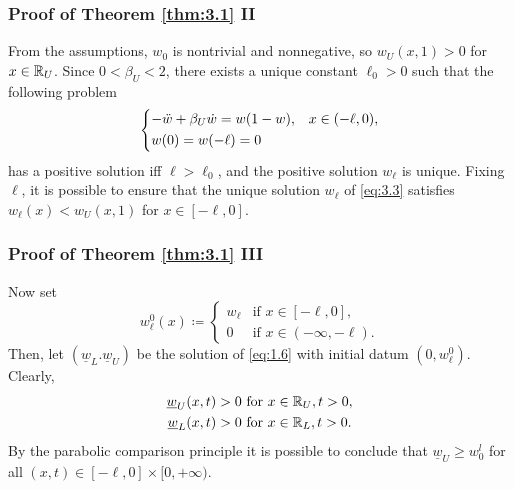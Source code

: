 \begin{frame}
    \frametitle{Proof of Theorem \ref{thm:3.1} II}
    \begin{proofc}
        From the assumptions, \(w_0\) is nontrivial and nonnegative, so \(w_U(x, 1) > 0\) for \(x \in \mathbb{R}_U\). Since \(0 < \beta_U < 2\), there exists a unique constant \(\ell_0 > 0\) such that the following problem
        \begin{equation}
            \begin{dcases}
                -\ddot{w} + \beta_U \dot{w} = w(1 - w), & x \in (-\ell, 0), \\
                w(0) = w(-\ell) = 0
            \end{dcases}
            \label{eq:3.3}
        \end{equation}
        has a positive solution iff \(\ell > \ell_0\), and the positive solution \(w_\ell\) is unique. Fixing \(\ell\), it is possible to ensure that the unique solution \(w_\ell\) of \eqref{eq:3.3} satisfies \(w_\ell(x) < w_U(x, 1)\) for \(x \in [-\ell, 0]\).
    \end{proofc}
\end{frame}

\begin{frame}
    \frametitle{Proof of Theorem \ref{thm:3.1} III}
    \begin{proofc}
        Now set 
    \begin{equation*}
        w_\ell^0(x) \coloneqq \begin{cases}
            w_\ell & \text{if } x \in [-\ell, 0], \\
            0 & \text{if } x \in (-\infty, -\ell).
        \end{cases}
    \end{equation*}
    Then, let \((\underline{w}_L. \underline{w}_U)\) be the solution of \eqref{eq:1.6} with initial datum \((0, w_\ell^0)\). Clearly,
    \begin{align*}
        \underline{w}_U(x, t) > 0 & \text{ for } x \in \mathbb{R}_U, t > 0, \\
        \underline{w}_L(x, t) > 0 & \text{ for } x \in \mathbb{R}_L, t > 0.
    \end{align*}
    By the parabolic comparison principle it is possible to conclude that \(\underline{w}_U \geq w_0^l\) for all \((x,t) \in [-\ell, 0] \times [0, +\infty)\).
    \end{proofc}
\end{frame}

